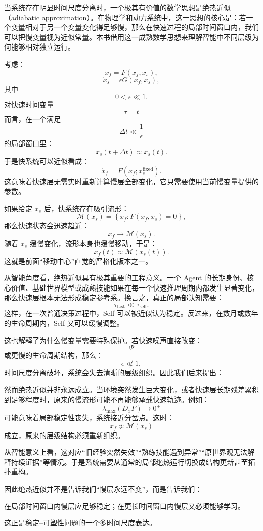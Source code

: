 当系统存在明显时间尺度分离时，一个极其有价值的数学思想是绝热近似（adiabatic approximation）。在物理学和动力系统中，这一思想的核心是：若一个变量相对于另一个变量变化得足够慢，那么在快速过程的局部时间窗口内，我们可以把慢变量视为近似常量。本书借用这一成熟数学思想来理解智能中不同层级为何能够相对独立运行。

考虑：
\[
\dot{x}_f
=
F(x_f,x_s),
\]
\[
\dot{x}_s
=
\epsilon
G(x_f,x_s),
\]
其中
\[
0<\epsilon\ll1.
\]
对快速时间变量
\[
\tau=t
\]
而言，在一个满足
\[
\Delta t
\ll
\frac{1}{\epsilon}
\]
的局部窗口里：
\[
x_s(t+\Delta t)
\approx
x_s(t).
\]
于是快系统可以近似看成：
\[
\dot{x}_f
=
F
\left(
x_f;
x_s^{\mathrm{fixed}}
\right).
\]
这意味着快速层无需实时重新计算慢层全部变化，它只需要使用当前慢变量提供的参数。

如果给定 $x_s$ 后，快系统存在吸引流形：
\[
\mathcal{M}(x_s)
=
\left\{
x_f:
F(x_f,x_s)=0
\right\},
\]
那么快速状态会迅速趋近：
\[
x_f
\rightarrow
\mathcal{M}(x_s).
\]
随着 $x_s$ 缓慢变化，流形本身也缓慢移动，于是：
\[
x_f(t)
\approx
\mathcal{M}
\left(
x_s(t)
\right).
\]
这就是前面“移动中心”直觉的严格化版本之一。

从智能角度看，绝热近似具有极其重要的工程意义。一个 Agent 的长期身份、核心价值、基础世界模型或成熟技能如果在每一个快速推理周期内都发生显著变化，那么快速层根本无法形成稳定参考系。换言之，真正的局部认知需要：
\[
\tau_{\mathrm{fast}}
\ll
\tau_{\mathrm{self}}.
\]
这样，在一次普通决策过程中，Self 可以被近似认为稳定。反过来，在数月或数年的生命周期内，Self 又可以缓慢调整。

这也解释了为什么慢变量需要特殊保护。若快速噪声直接改变：
\[
\Psi
\]
或更慢的生命周期结构，那么：
\[
\epsilon
\not\ll
1,
\]
时间尺度分离破坏，系统会失去清晰的层级组织。因此我们后来提出：
\begin{statementbox}
\centering
{}
\end{statementbox}

然而绝热近似并非永远成立。当环境突然发生巨大变化，或者快速层长期残差累积到足够程度时，原来的慢流形可能不再能够承载快速轨迹。例如：
\[
\lambda_{\max}
\left(
D_xF
\right)
\rightarrow
0^+
\]
可能意味着局部稳定性丧失，系统接近分岔点。这时：
\[
x_f
\not\approx
\mathcal{M}(x_s)
\]
成立，原来的层级结构必须重新组织。

从智能意义上看，这对应“旧经验突然失效”“熟练技能遇到异常”“原世界观无法解释持续证据”等情况。于是系统需要从通常的局部绝热运行切换成结构更新甚至拓扑重构。

因此绝热近似并不是告诉我们“慢层永远不变”，而是告诉我们：
\begin{statementbox}
在局部时间窗口内慢层应足够稳定；在更长时间窗口内慢层又必须能够学习。
\end{statementbox}
这正是稳定--可塑性问题的一个多时间尺度表达。

